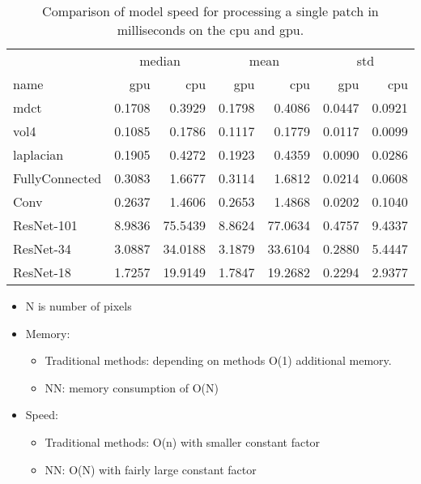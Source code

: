 \begin{table}[ht]
    \centering
    \caption{Comparison of model speed for processing a single patch in milliseconds on the \ac{cpu} and \ac{gpu}.}
    \label{tab:Results:Computation:Speed}
    \begin{tabular}{|l|rr|rr|rr|}
        \hline
        \multicolumn{1}{|c|}{} & \multicolumn{2}{c|}{median} & \multicolumn{2}{c|}{mean} & \multicolumn{2}{c|}{std} \\
        name & \acs{gpu} & \acs{cpu} & \acs{gpu} & \acs{cpu} & \acs{gpu} & \acs{cpu} \\
        \hline
        \acs{mdct}      & 0.1708 &  0.3929 & 0.1798 &  0.4086 & 0.0447 & 0.0921 \\
        \acs{vol4}      & 0.1085 &  0.1786 & 0.1117 &  0.1779 & 0.0117 & 0.0099 \\
        \acs{laplacian} & 0.1905 &  0.4272 & 0.1923 &  0.4359 & 0.0090 & 0.0286 \\
        \hline
        FullyConnected  & 0.3083 &  1.6677 & 0.3114 &  1.6812 & 0.0214 & 0.0608 \\
        Conv            & 0.2637 &  1.4606 & 0.2653 &  1.4868 & 0.0202 & 0.1040 \\
        ResNet-101      & 8.9836 & 75.5439 & 8.8624 & 77.0634 & 0.4757 & 9.4337 \\
        ResNet-34       & 3.0887 & 34.0188 & 3.1879 & 33.6104 & 0.2880 & 5.4447 \\
        ResNet-18       & 1.7257 & 19.9149 & 1.7847 & 19.2682 & 0.2294 & 2.9377 \\
        \hline
    \end{tabular}
\end{table}

\begin{itemize}
    \item N is number of pixels
    \item Memory: 
    \begin{itemize}
        \item Traditional methods: depending on methods O(1) additional memory.
        \item NN: memory consumption of O(N)
    \end{itemize}
    \item Speed:
    \begin{itemize}
        \item Traditional methods: O(n) with smaller constant factor
        \item NN: O(N) with fairly large constant factor
    \end{itemize}
\end{itemize}